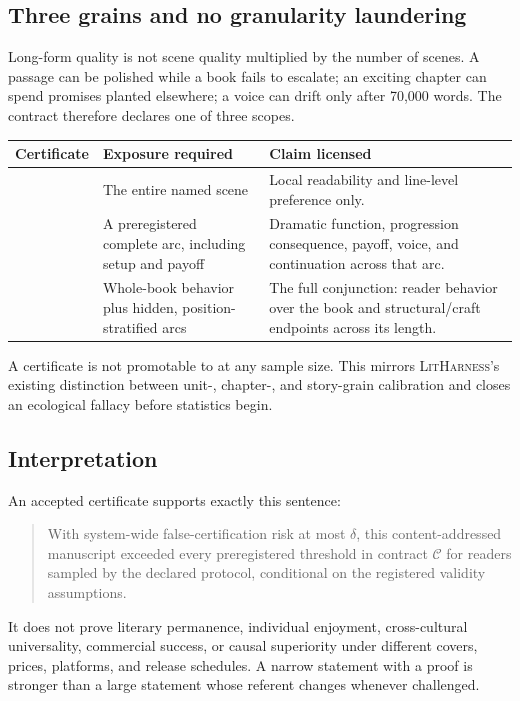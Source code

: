 \documentclass[11pt]{article}
\theoremstyle{remark}
\newcommand{\system}{\textsc{LitHarness}}
\newcommand{\code}[1]{\texttt{\detokenize{#1}}}
\begin{document}
\subsection{Three grains and no granularity laundering}

Long-form quality is not scene quality multiplied by the number of scenes. A passage can be
polished while a book fails to escalate; an exciting chapter can spend promises planted
elsewhere; a voice can drift only after 70,000 words. The contract therefore declares one of
three scopes.

\begin{center}
\small
\begin{tabular}{p{}p{}p{}}
\toprule
Certificate & Exposure required & Claim licensed \\
\midrule
\code{SCENE} & The entire named scene & Local readability and line-level preference only. \\
\code{ARC} & A preregistered complete arc, including setup and payoff & Dramatic function,
progression consequence, payoff, voice, and continuation across that arc. \\
\code{BOOK} & Whole-book behavior plus hidden, position-stratified arcs & The full conjunction:
reader behavior over the book and structural/craft endpoints across its length. \\
\bottomrule
\end{tabular}
\end{center}

A \code{SCENE} certificate is not promotable to \code{BOOK} at any sample size. This mirrors
\system's existing distinction between unit-, chapter-, and story-grain calibration and
closes an ecological fallacy before statistics begin.

\subsection{Interpretation}

An accepted certificate supports exactly this sentence:

\begin{quote}
With system-wide false-certification risk at most $\delta$, this content-addressed manuscript
exceeded every preregistered threshold in contract $\mathcal C$ for readers sampled by the
declared protocol, conditional on the registered validity assumptions.
\end{quote}

It does not prove literary permanence, individual enjoyment, cross-cultural universality,
commercial success, or causal superiority under different covers, prices, platforms, and
release schedules. A narrow statement with a proof is stronger than a large statement whose
referent changes whenever challenged.
\end{document}
